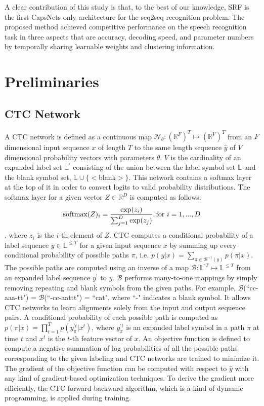 \documentclass[review]{elsarticle}
\begin{document}
A clear contribution of this study is that, to the best of our knowledge, SRF is the first CapsNets only architecture for the seq2seq recognition problem. 
The proposed method achieved competitive performance on the speech recognition task in three aspects that are accuracy, decoding speed, and parameter numbers by temporally sharing learnable weights and clustering information.

\section{Preliminaries}
\subsection{CTC Network}
A CTC network \citep{DBLP:conf/icml/GravesFGS06} is defined as a continuous map $\mathcal{N}_\theta: (\mathbb{R}^F)^T \mapsto (\mathbb{R}^{V})^T$ from an $F$ dimensional input sequence $x$ of length $T$ to the same length sequence $\hat{y}$ of $V$ dimensional probability vectors with parameters $\theta$.
$V$ is the cardinality of an expanded label set $\mathbb{L}^\prime$ consisting of the union between the label symbol set $\mathbb{L}$ and the blank symbol set, $\mathbb{L} \cup \{<$blank$>\}$.
This network contains a softmax layer at the top of it in order to convert logits to valid probability distributions.
The softmax layer for a given vector $Z \in \mathbb{R}^D$ is computed as follows:
\begin{equation}
\text{softmax}(Z)_i = {{\exp(z_i)} \over {\sum^D_{j=1} \exp(z_{j})}}, \text{for } i=1,...,D
\label{eq:softmax}
\end{equation}
, where $z_i$ is the $i$-th element of $Z$.
CTC computes a conditional probability of a label sequence $y \in \mathbb{L} ^{\leq T}$ for a given input sequence $x$ by summing up every conditional probability of possible paths $\pi$, i.e. $p(y|x) = \sum_{\pi \in \mathcal{B}^{-1}(y)} p(\pi|x)$.
The possible paths are computed using an inverse of a map $\mathcal{B}: \mathbb{L}^{\prime T} \mapsto \mathbb{L}^{\leq T}$ from an expanded label sequence $y^\prime$ to $y$.
$\mathcal{B}$ performs many-to-one mappings by simply removing repeating and blank symbols from the given paths.
For example, $\mathcal{B}$(``cc-aaa-tt") = $\mathcal{B}$(``-cc-aattt") = ``cat", where ``-" indicates a blank symbol.
It allows CTC networks to learn alignments solely from the input and output sequence pairs.
A conditional probability of each possible path is computed as $p(\pi|x)=\prod_{t=1}^T p(y^{\prime t}_\pi |x^t)$, where $y^{\prime t}_\pi$ is an expanded label symbol in a path $\pi$ at time $t$ and $x^t$ is the $t$-th feature vector of $x$.
An objective function is defined to compute a negative summation of log probabilities of all the possible paths corresponding to the given labeling and CTC networks are trained to minimize it.
The gradient of the objective function can be computed with respect to $\hat{y}$ with any kind of gradient-based optimization techniques.
To derive the gradient more efficiently, the CTC forward-backward algorithm, which is a kind of dynamic programming, is applied during training.
\end{document}
